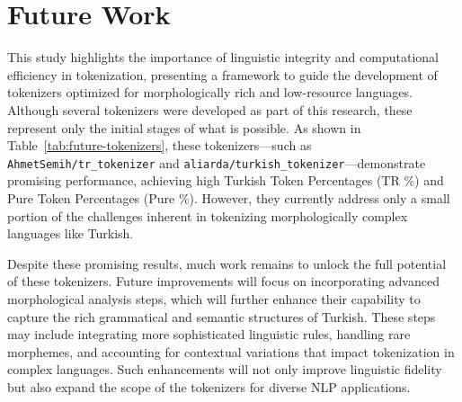 \section{Future Work}

This study highlights the importance of linguistic integrity and computational efficiency in tokenization, presenting a framework to guide the development of tokenizers optimized for morphologically rich and low-resource languages. Although several tokenizers were developed as part of this research, these represent only the initial stages of what is possible. As shown in Table~\ref{tab:future-tokenizers}, these tokenizers—such as \texttt{AhmetSemih/tr\_tokenizer} and \texttt{aliarda/turkish\_tokenizer}—demonstrate promising performance, achieving high Turkish Token Percentages (TR \%) and Pure Token Percentages (Pure \%). However, they currently address only a small portion of the challenges inherent in tokenizing morphologically complex languages like Turkish.

\begin{table}[h]
\centering
\caption{Performance Metrics of Tokenizers at Initial Development Stage}
\label{tab:future-tokenizers}
\end{table}

Despite these promising results, much work remains to unlock the full potential of these tokenizers. Future improvements will focus on incorporating advanced morphological analysis steps, which will further enhance their capability to capture the rich grammatical and semantic structures of Turkish. These steps may include integrating more sophisticated linguistic rules, handling rare morphemes, and accounting for contextual variations that impact tokenization in complex languages. Such enhancements will not only improve linguistic fidelity but also expand the scope of the tokenizers for diverse NLP applications.

